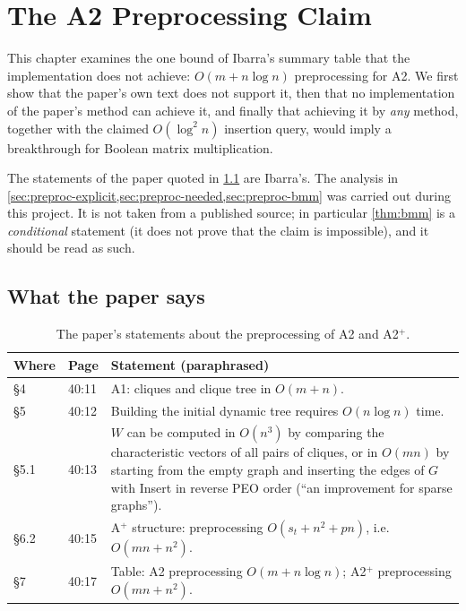 \documentclass[11pt,a4paper,oneside]{report}
\theoremstyle{plain}
\theoremstyle{definition}
\theoremstyle{remark}
\newcommand{\op}[1]{\textsf{#1}}
\begin{document}
\chapter{The A2 Preprocessing Claim}\label{ch:preprocessing}
This chapter examines the one bound of Ibarra's summary table that the implementation does not
achieve: \(O(m+n\log n)\) preprocessing for A2. We first show that the paper's own text does not
support it, then that no implementation of the paper's method can achieve it, and finally that
achieving it by \emph{any} method, together with the claimed \(O(\log^2 n)\) insertion query,
would imply a breakthrough for Boolean matrix multiplication.

\begin{caution}
The statements of the paper quoted in \cref{sec:preproc-paper} are Ibarra's. The analysis in
\cref{sec:preproc-explicit,sec:preproc-needed,sec:preproc-bmm} was carried out during this
project. It is not taken from a published source; in particular \cref{thm:bmm} is a
\emph{conditional} statement (it does not prove that the claim is impossible), and it should be
read as such.
\end{caution}

\section{What the paper says}\label{sec:preproc-paper}
\begin{table}[ht]
\centering\small
\caption[Statements of the paper about A2 preprocessing]{The paper's statements about the
preprocessing of A2 and A2\(^+\).}\label{tab:preproc-statements}
\begin{tabularx}{\textwidth}{@{}llX@{}}
\toprule
\textbf{Where} & \textbf{Page} & \textbf{Statement (paraphrased)}\\
\midrule
\S4 & 40:11 & A1: cliques and clique tree in \(O(m+n)\).\\
\S5 & 40:12 & Building the initial dynamic tree requires \(O(n\log n)\) time.\\
\S5.1 & 40:13 & \(W\) can be computed in \(O(n^3)\) by comparing the characteristic vectors of all pairs of cliques, or in \(O(mn)\) by starting from the empty graph and inserting the edges of \(G\) with \op{Insert} in reverse PEO order (``an improvement for sparse graphs'').\\
\S6.2 & 40:15 & A\(^+\) structure: preprocessing \(O(s_t+n^2+pn)\), i.e.\ \(O(mn+n^2)\).\\
\S7 & 40:17 & Table: A2 preprocessing \(O(m+n\log n)\); A2\(^+\) preprocessing \(O(mn+n^2)\).\\
\bottomrule
\end{tabularx}
\end{table}
\end{document}

